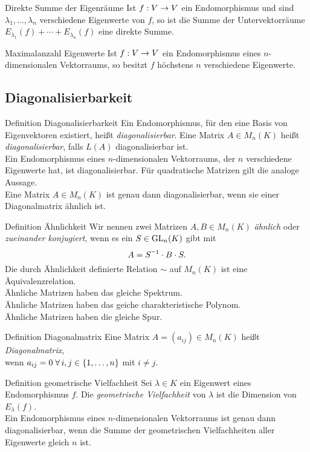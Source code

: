 \documentclass[main.tex]{subfiles}
\begin{document}
\begin{karte}{Direkte Summe der Eigenräume}
    Ist \( f : V \rightarrow V \) ein Endomorphismus und sind 
    \( \lambda_1,\ldots,\lambda_n \) verschiedene Eigenwerte 
    von \(f\), so ist die Summe der Untervektorräume 
    \( E_{\lambda_1}(f) + \cdots + E_{\lambda_n}(f) \) eine 
    direkte Summe.
\end{karte}
\begin{karte}{Maximalanzahl Eigenwerte}
    Ist \( f : V \rightarrow V \) ein Endomorphismus eines 
    \(n\)-dimensionalen Vektorraums, so besitzt \(f\) 
    höchstens \(n\) verschiedene Eigenwerte.
\end{karte}
\subsection*{Diagonalisierbarkeit}
\begin{karte}{Definition Diagonalisierbarkeit}
    Ein Endomorphismus, für den eine Basis von Eigenvektoren 
    existiert, heißt \textit{diagonalisierbar}. Eine Matrix 
    \( A \in M_n(K) \) heißt \textit{diagonalisierbar}, falls 
    \( L(A) \) diagonalisierbar ist.\\
    Ein Endomorphismus eines \(n\)-dimensionalen Vektorraums, 
    der \(n\) verschiedene Eigenwerte hat, ist diagonalisierbar. 
    Für quadratische Matrizen gilt die analoge Aussage.\\
    Eine Matrix \( A \in M_n(K) \) ist genau dann diagonalisierbar, 
    wenn sie einer Diagonalmatrix ähnlich ist.
\end{karte}
\begin{karte}{Definition Ähnlichkeit}
    Wir nennen zwei Matrizen \( A, B \in M_n(K) \) 
    \textit{ähnlich} oder \textit{zueinander konjugiert}, 
    wenn es ein \( S \in \operatorname{GL}_n(K) \) gibt mit 
    \[ A = \inverse{S} \cdot B \cdot S. \]
    Die durch Ähnlichkeit definierte Relation \( \sim \) 
    auf \( M_n(K) \) ist eine Äquivalenzrelation.\\
    Ähnliche Matrizen haben das gleiche Spektrum.\\
    Ähnliche Matrizen haben das geiche charakteristische Polynom.\\
    Ähnliche Matrizen haben die gleiche Spur.
\end{karte}
\begin{karte}{Definition Diagonalmatrix}
    Eine Matrix \( A = (a_{ij}) \in M_n(K) \) heißt 
    \textit{Diagonalmatrix}, \\
    wenn \( a_{ij} = 0 
    \; \forall i,j \in \set{1,\ldots,n} \) mit \( i \neq j \).\\
\end{karte}
\begin{karte}{Definition geometrische Vielfachheit}
    Sei \( \lambda \in K \) ein Eigenwert eines Endomorphismus 
    \( f \). Die \textit{geometrische Vielfachheit} von 
    \( \lambda \) ist die Dimension von \( E_\lambda(f) \).\\
    Ein Endomorphismus eines \(n\)-dimensionalen Vektorraums 
    ist genau dann diagonalisierbar, wenn die Summe der 
    geometrischen Vielfachheiten aller Eigenwerte gleich 
    \(n\) ist.
\end{karte}
\end{document}
